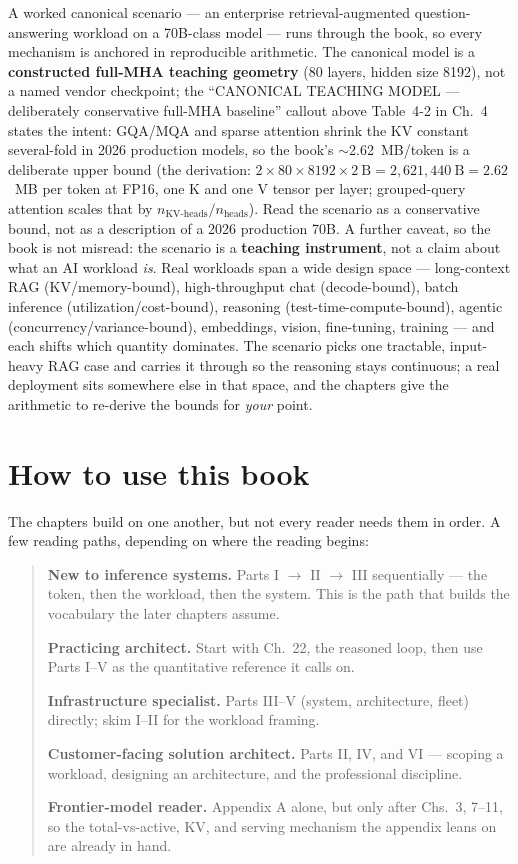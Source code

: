 A worked canonical scenario --- an enterprise retrieval-augmented
question-answering workload on a 70B-class model --- runs through the book,
so every mechanism is anchored in reproducible arithmetic. The canonical
model is a \textbf{constructed full-MHA teaching geometry} (80 layers,
hidden size 8192), not a named vendor checkpoint; the
``CANONICAL TEACHING MODEL --- deliberately conservative full-MHA baseline''
callout above Table~4-2 in Ch.~4 states the intent: GQA/MQA and sparse
attention shrink the KV constant several-fold in 2026 production models, so
the book's $\sim$2.62~MB/token is a deliberate upper bound (the derivation:
$2\times80\times8192\times2~\text{B} = 2{,}621{,}440~\text{B} = 2.62$~MB per
token at FP16, one K and one V tensor per layer; grouped-query attention
scales that by $n_{\text{KV-heads}}/n_{\text{heads}}$). Read the
scenario as a conservative bound, not as a description of a 2026 production
70B. A further caveat, so the
book is not misread: the scenario is a \textbf{teaching instrument}, not a
claim about what an AI workload \emph{is}. Real workloads span a wide design
space --- long-context RAG (KV/memory-bound), high-throughput chat
(decode-bound), batch inference (utilization/cost-bound), reasoning
(test-time-compute-bound), agentic (concurrency/variance-bound),
embeddings, vision, fine-tuning, training --- and each shifts which quantity
dominates. The scenario picks one tractable, input-heavy RAG case and carries
it through so the reasoning stays continuous; a real deployment sits
somewhere else in that space, and the chapters give the arithmetic to
re-derive the bounds for \emph{your} point.

\section*{How to use this book}

The chapters build on one another, but not every reader needs them in order.
A few reading paths, depending on where the reading begins:

\begin{quote}
\textbf{New to inference systems.} Parts I $\to$ II $\to$ III sequentially ---
the token, then the workload, then the system. This is the path that builds
the vocabulary the later chapters assume.

\textbf{Practicing architect.} Start with Ch.~22, the reasoned loop, then use
Parts I--V as the quantitative reference it calls on.

\textbf{Infrastructure specialist.} Parts III--V (system, architecture, fleet)
directly; skim I--II for the workload framing.

\textbf{Customer-facing solution architect.} Parts II, IV, and VI --- scoping a
workload, designing an architecture, and the professional discipline.

\textbf{Frontier-model reader.} Appendix A alone, but only after Chs.~3, 7--11,
so the total-vs-active, KV, and serving mechanism the appendix leans on are
already in hand.
\end{quote}

